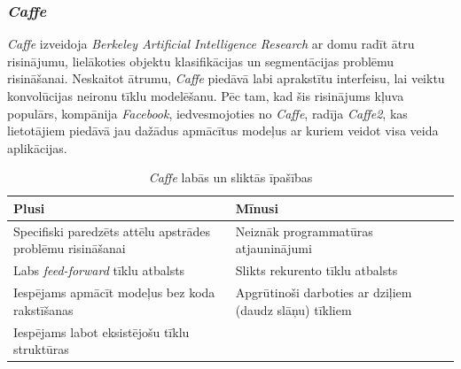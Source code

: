 \subsubsection{\textit{Caffe}}

\textit{Caffe} izveidoja \textit{Berkeley Artificial Intelligence Research} ar domu radīt ātru risinājumu, lielākoties objektu klasifikācijas un segmentācijas problēmu risināšanai. Neskaitot ātrumu, \textit{Caffe} piedāvā labi aprakstītu interfeisu, lai veiktu konvolūcijas neironu tīklu modelēšanu. Pēc tam, kad šis risinājums kļuva populārs, kompānija \textit{Facebook}, iedvesmojoties no \textit{Caffe}, radīja \textit{Caffe2}, kas lietotājiem piedāvā jau dažādus apmācītus modeļus ar kuriem veidot visa veida aplikācijas. 

	\begin{table}[ht!]	
		\centering
		\begin{tabular}{ |p{8cm}|p{7cm}| }
			\hline
			\textbf{Plusi} & \textbf{Mīnusi}\\ \hline
			Specifiski paredzēts attēlu apstrādes problēmu risināšanai & Neiznāk programmatūras atjauninājumi \\ \hline 
			Labs \textit{feed-forward} tīklu atbalsts  & Slikts rekurento tīklu atbalsts \\ \hline
			Iespējams apmācīt modeļus bez koda rakstīšanas  &  Apgrūtinoši darboties ar dziļiem (daudz slāņu) tīkliem\\  \hline
			Iespējams labot eksistējošu tīklu struktūras  & \\ \hline
		\end{tabular}
		\caption{\textit{Caffe} labās un sliktās īpašības}
	\end{table}


